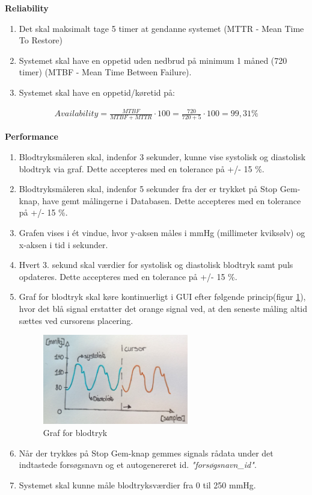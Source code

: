 \textbf{Reliability}
\begin{enumerate}
\item Det skal maksimalt tage 5 timer at gendanne systemet (MTTR - Mean Time To Restore)
\item Systemet skal have en oppetid uden nedbrud på minimum 1 måned (720 timer) (MTBF - Mean Time Between Failure).   
\item Systemet skal have en oppetid/køretid på: 
\end{enumerate}

				\begin{align}
					Availability = \frac{MTBF}{MTBF+MTTR}\cdot100 = \frac{720}{720+5}\cdot100 = 99,31 \%
				\end{align}



\textbf{Performance}
\begin{enumerate}
\item Blodtryksmåleren skal, indenfor 3 sekunder, kunne vise systolisk og diastolisk blodtryk via graf. Dette accepteres med en tolerance på +/- 15 \%.
\item Blodtryksmåleren skal, indenfor 5 sekunder fra der er trykket på Stop Gem-knap, have gemt målingerne i Databasen. Dette accepteres med en tolerance på +/- 15 \%.
\item Grafen vises i ét vindue, hvor y-aksen måles i mmHg (millimeter kviksølv) og x-aksen i tid i sekunder. 
\item Hvert 3. sekund skal værdier for systolisk og diastolisk blodtryk samt puls opdateres. Dette accepteres med en tolerance på +/- 15 \%.
\item Graf for blodtryk skal køre kontinuerligt i GUI efter følgende princip(figur \ref{fig:Graf for blodtryks visning}), hvor det blå signal erstatter det orange signal ved, at den seneste måling altid sættes ved cursorens placering.
\begin{figure}[H]
	\centering
	\includegraphics[width=0.6\textwidth]{Figurer/Cursor}
	\caption{Graf for blodtryk}
	\label{fig:Graf for blodtryks visning}
\end{figure}

\item Når der trykkes på Stop Gem-knap gemmes signals rådata under det indtastede forsøgsnavn og et autogenereret id. \textit{"forsøgsnavn\_id"}.
\item Systemet skal kunne måle blodtryksværdier fra 0 til 250 mmHg.
\end{enumerate}


